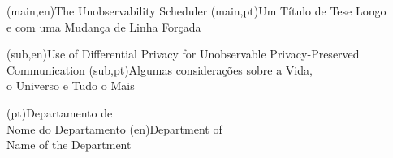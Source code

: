 
%


\nttitle(main,en){The Unobservability Scheduler}%
\nttitle(main,pt){Um Título de Tese Longo\\e com uma Mudança de Linha Forçada}%

\nttitle(sub,en){Use of Differential Privacy for Unobservable Privacy-Preserved Communication}%
\nttitle(sub,pt){Algumas considerações sobre a Vida,\\o Universo e Tudo o Mais}%


\ntdepartment*(pt){Departamento de\\Nome do Departamento}
\ntdepartment*(en){Department of\\Name of the Department}

